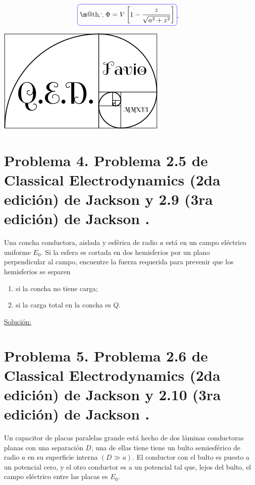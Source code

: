 \documentclass[a4paper,10pt]{article}
\makeatletter
\numberwithin{equation}{section}
\newcommand*{\boxcolor}{blue}
\renewcommand{\boxed}[1]{\textcolor{\boxcolor}{%
\tikz[baseline={([yshift=-1ex]current bounding box.center)}] \node [rectangle, minimum width=1ex,rounded corners,draw] {\normalcolor\m@th$\displaystyle#1$};}}
\makeatother
\begin{document}
\begin{equation}
 \boxed{\therefore \Phi = V \left[1 - \frac{z}{\sqrt{a^2 + z^2}} \right]}.
\end{equation}

\hspace{10cm}\includegraphics[scale=0.2]{logoQED}

\section{Problema 4. Problema 2.5 de Classical Electrodynamics (2da edición) de Jackson 
\cite{jackson2} y 2.9 (3ra edición) de Jackson \cite{jackson3}.}

Una concha conductora, aislada y esférica de radio $a$ está en un campo eléctrico 
uniforme $E_0$. Si la esfera es cortada en dos hemisferios por un plano perpendicular 
al campo, encuentre la fuerza requerida para prevenir que los hemisferios se 
separen 

\begin{enumerate}[label=\textbf{(\alph*)}]
 \item si la concha no tiene carga;
 \item si la carga total en la concha es $Q$.
\end{enumerate}

\vspace{.3cm}

\underline{Solución:} \vspace{.3cm}

\section{Problema 5. Problema 2.6 de Classical Electrodynamics (2da edición) de Jackson 
\cite{jackson2} y 2.10 (3ra edición) de Jackson \cite{jackson3}.}

Un capacitor de placas paralelas grande está hecho de dos láminas conductoras 
planas con una separación $D$, una de ellas tiene tiene un bulto semiesférico 
de radio $a$ en su superficie interna $(D \gg a)$. El conductor con el bulto 
es puesto a un potencial cero, y el otro conductor es a un potencial tal que, 
lejos del bulto, el campo eléctrico entre las placas es $E_0$.
\end{document}
